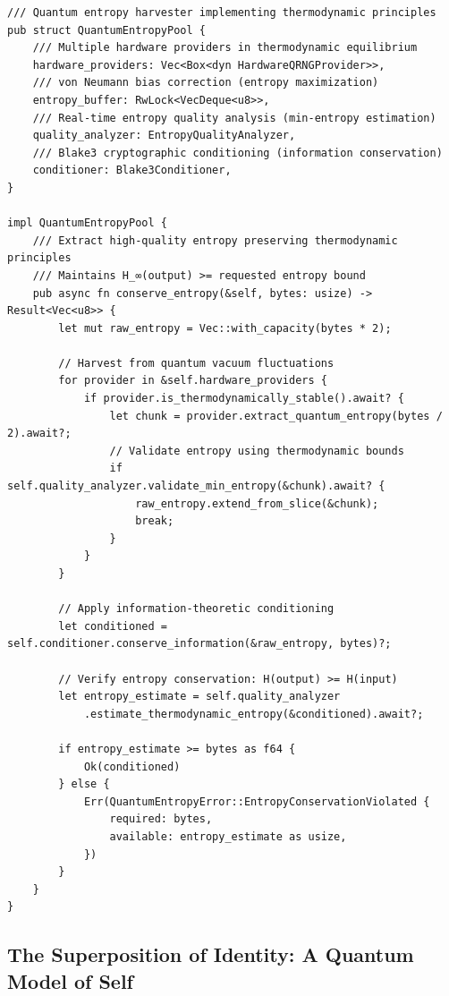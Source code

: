 \documentclass[12pt,a4paper]{article}
\begin{document}
\begin{lstlisting}[style=rustcode, caption=Entropy Conservation Implementation]
/// Quantum entropy harvester implementing thermodynamic principles
pub struct QuantumEntropyPool {
    /// Multiple hardware providers in thermodynamic equilibrium
    hardware_providers: Vec<Box<dyn HardwareQRNGProvider>>,
    /// von Neumann bias correction (entropy maximization)
    entropy_buffer: RwLock<VecDeque<u8>>,
    /// Real-time entropy quality analysis (min-entropy estimation)
    quality_analyzer: EntropyQualityAnalyzer,
    /// Blake3 cryptographic conditioning (information conservation)
    conditioner: Blake3Conditioner,
}

impl QuantumEntropyPool {
    /// Extract high-quality entropy preserving thermodynamic principles
    /// Maintains H_∞(output) >= requested entropy bound
    pub async fn conserve_entropy(&self, bytes: usize) -> Result<Vec<u8>> {
        let mut raw_entropy = Vec::with_capacity(bytes * 2);
        
        // Harvest from quantum vacuum fluctuations
        for provider in &self.hardware_providers {
            if provider.is_thermodynamically_stable().await? {
                let chunk = provider.extract_quantum_entropy(bytes / 2).await?;
                // Validate entropy using thermodynamic bounds
                if self.quality_analyzer.validate_min_entropy(&chunk).await? {
                    raw_entropy.extend_from_slice(&chunk);
                    break;
                }
            }
        }
        
        // Apply information-theoretic conditioning
        let conditioned = self.conditioner.conserve_information(&raw_entropy, bytes)?;
        
        // Verify entropy conservation: H(output) >= H(input)
        let entropy_estimate = self.quality_analyzer
            .estimate_thermodynamic_entropy(&conditioned).await?;
            
        if entropy_estimate >= bytes as f64 {
            Ok(conditioned)
        } else {
            Err(QuantumEntropyError::EntropyConservationViolated {
                required: bytes,
                available: entropy_estimate as usize,
            })
        }
    }
}
\end{lstlisting}

\subsection{The Superposition of Identity: A Quantum Model of Self}
\end{document}
